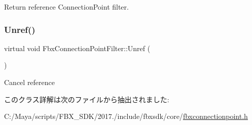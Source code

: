 Return reference Connection\+Point filter. 

\mbox{\label{class_fbx_connection_point_filter_ab56025ba81b8ffa45d6a312fad9dcf20}} 
\subsubsection{\texorpdfstring{Unref()}{Unref()}}
{\footnotesize\ttfamily virtual void Fbx\+Connection\+Point\+Filter\+::\+Unref (\begin{DoxyParamCaption}{ }\end{DoxyParamCaption})\hspace{0.3cm}{\ttfamily [virtual]}}



Cancel reference 



このクラス詳解は次のファイルから抽出されました\+:\begin{DoxyCompactItemize}
\item 
C\+:/\+Maya/scripts/\+F\+B\+X\+\_\+\+S\+D\+K/2017./include/fbxsdk/core/\hyperlink{fbxconnectionpoint_8h}{fbxconnectionpoint.\+h}\end{DoxyCompactItemize}
